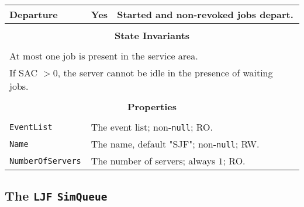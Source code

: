 \documentclass[12pt]{book}
\begin{document}
\begin{tabular}{|l|l|l|}
Departure & Yes & Started and non-revoked jobs depart. \\
\hline
\multicolumn{3}{|c|}{} \\
\multicolumn{3}{|c|}{\bf State  Invariants} \\
\multicolumn{3}{|c|}{} \\
\hline
\multicolumn{3}{|l|}{At most one job is present in the service area.} \\
\multicolumn{3}{|l|}{If SAC $> 0$, the server cannot be idle in the presence of waiting jobs.} \\
\hline
\multicolumn{3}{|c|}{} \\
\multicolumn{3}{|c|}{\bf Properties} \\
\multicolumn{3}{|c|}{} \\
\hline
\lstinline|EventList|       & \multicolumn{2}{|l|}{The event list; non-\lstinline|null|; RO.} \\
\hline
\lstinline|Name|            & \multicolumn{2}{|l|}{The name, default "SJF"; non-\lstinline|null|; RW.} \\
\hline
\lstinline|NumberOfServers| & \multicolumn{2}{|l|}{The number of servers; always $1$; RO.} \\
\hline
\end{tabular}

\subsection{The \lstinline{LJF} \lstinline{SimQueue}}
 
\end{document}
